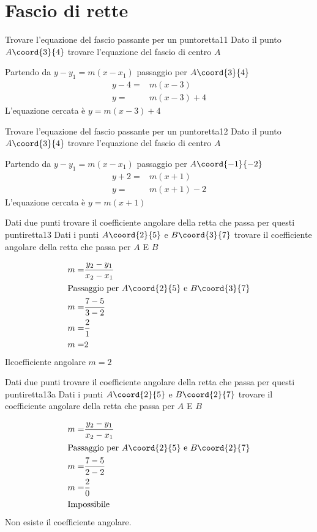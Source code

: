 \section{Fascio di rette}
\begin{esempiot}{Trovare l'equazione del fascio passante per un punto}{retta11}
	Dato il punto	$A\coord{3}{4}$ trovare l'equazione del fascio di centro $A$
\end{esempiot}
Partendo da $y-y_1=m(x-x_1)$ passaggio per 	$A\coord{3}{4}$
\begin{align*}
	y-4=&m(x-3)\\
	y=&m(x-3)+4
\end{align*}
L'equazione cercata è $y=m(x-3)+4$
\begin{esempiot}{Trovare l'equazione del fascio passante per un punto}{retta12}
	Dato il punto	$A\coord{3}{4}$ trovare l'equazione del fascio di centro $A$
\end{esempiot}
Partendo da $y-y_1=m(x-x_1)$ passaggio per 	$A\coord{-1}{-2}$
\begin{align*}
	y+2=&m(x+1)\\
	y=&m(x+1)-2
\end{align*}
L'equazione cercata è $y=m(x+1)$
\begin{esempiot}{Dati due punti trovare il coefficiente angolare della retta che passa per questi punti}{retta13}
	Dati i punti $A\coord{2}{5}$ e $B\coord{3}{7}$ trovare il coefficiente angolare della retta che passa per  $A$ E $B$
\end{esempiot}
\begin{align*}
	m=&\dfrac{y_2-y_1}{x_2-x_1}\\
	\intertext{Passaggio per $A\coord{2}{5}$ e $B\coord{3}{7}$}
	m=&\dfrac{7-5}{3-2}\\
	m=&\dfrac{2}{1}\\
	m=&2\\
\end{align*}
Ilcoefficiente angolare $m=2$
\begin{cesempiot}{Dati due punti trovare il coefficiente angolare della retta che passa per questi punti}{retta13a}
	Dati i punti $A\coord{2}{5}$ e $B\coord{2}{7}$ trovare il coefficiente angolare della retta che passa per  $A$ E $B$
\end{cesempiot}
\begin{align*}
	m=&\dfrac{y_2-y_1}{x_2-x_1}\\
	\intertext{Passaggio per $A\coord{2}{5}$ e $B\coord{2}{7}$}
	m=&\dfrac{7-5}{2-2}\\
	m=&\dfrac{2}{0}\\
\intertext{Impossibile}
\end{align*}
Non esiste il coefficiente angolare.

